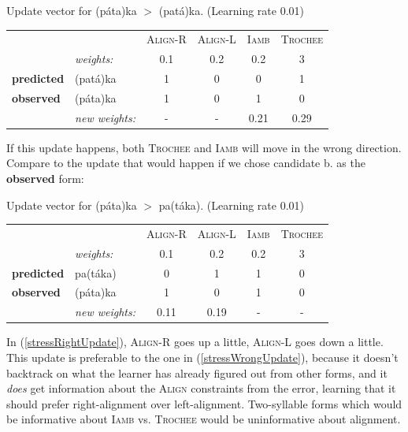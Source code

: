 \documentclass[12]{article}
\begin{document}
	\begin{exe}
		\ex\label{stressWrongUpdate} Update vector for (p\'ata)ka $>$ (pat\'a)ka.  (Learning rate 0.01)
		
		\begin{tabular}{ll|cccc}
  		 &                  &\textsc{Align-R} 	& \textsc{Align-L} 	& \textsc{Iamb}	& \textsc{Trochee} \\
  		 &  {\it weights:} 	&		0.1			&		0.2			&		0.2		&		3			\\
  		 \hline
{\bf predicted}	& (pat\'a)ka &		1			&		0			&		0		&		1			\\
{\bf observed}	& (p\'ata)ka &		1			&		0			&		1		&		0			\\
		\hline
		 & {\it new weights:}&		-			&		-			&		0.21	&		0.29		\\
		\end{tabular}
		
	\end{exe}
	

If this update happens, both \textsc{Trochee} and \textsc{Iamb} will move in the wrong direction.  Compare to the update that would happen if we chose candidate b. as the {\bf observed} form:
  	
  	
	\begin{exe}
	\ex\label{stressRightUpdate} Update vector for (p\'ata)ka $>$ pa(t\'aka).  (Learning rate 0.01)
	
	\begin{tabular}{ll|cccc}
		&                  &\textsc{Align-R} 	& \textsc{Align-L} 	& \textsc{Iamb}	& \textsc{Trochee} \\
		&  {\it weights:} 	&		0.1			&		0.2			&		0.2		&		3			\\
		\hline
{\bf predicted}	& pa(t\'aka) &		0			&		1			&		1		&		0			\\
{\bf observed}	& (p\'ata)ka &		1			&		0			&		1		&		0			\\
		\hline
& {\it new weights:} 		 &		0.11		&		0.19		&		- 		&		-			\\
	\end{tabular}
	
\end{exe}

In (\ref{stressRightUpdate}), \textsc{Align-R} goes up a little, \textsc{Align-L} goes down a little.  This update is preferable to the one in (\ref{stressWrongUpdate}), because it doesn't backtrack on what the learner has already figured out from other forms, and it {\it does} get information about the \textsc{Align} constraints from the error, learning that it should prefer right-alignment over left-alignment.  Two-syllable forms which would be informative about \textsc{Iamb} vs. \textsc{Trochee} would be uninformative about alignment.
\end{document}
